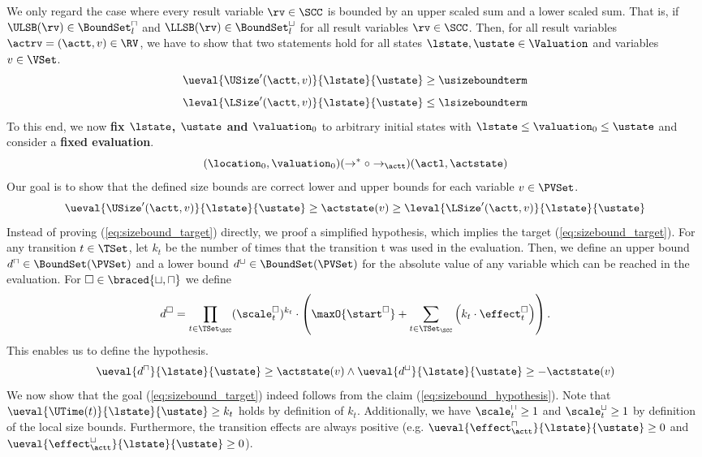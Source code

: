 We only regard the case where every result variable $\rv \in \SCC$ is bounded by an upper scaled sum and a lower scaled sum.
That is, if $\ULSB(\rv) \in \BoundSet^\sqcap_l$ and $\LLSB(\rv) \in \BoundSet^\sqcup_l$ for all result variables $\rv \in \SCC$.
Then, for all result variables $\actrv = (\actt, v) \in \RV$, we have to show that two statements hold for all states $\lstate, \ustate \in \Valuation$ and variables $v \in \VSet$.
\[ \ueval{\USize'(\actt, v)}{\lstate}{\ustate} \geq \usizeboundterm \]
\[ \leval{\LSize'(\actt, v)}{\lstate}{\ustate} \leq \lsizeboundterm \]
To this end, we now \textbf{fix $\lstate$, $\ustate$ and $\valuation_0$} to arbitrary initial states with $\lstate \leq \valuation_0 \leq \ustate$ and consider a \textbf{fixed evaluation}.
\[ (\location_0, \valuation_0) (\rightarrow^* \circ \rightarrow_\actt) (\actl, \actstate) \]
Our goal is to show that the defined size bounds are correct lower and upper bounds for each variable $v \in \PVSet$.
\begin{equation} \label{eq:sizebound_target}
  \ueval{\USize'(\actt, v)}{\lstate}{\ustate} \geq \actstate(v) \geq \leval{\LSize'(\actt, v)}{\lstate}{\ustate}
\end{equation}
Instead of proving (\ref{eq:sizebound_target}) directly, we proof a simplified hypothesis, which implies the target (\ref{eq:sizebound_target}).
For any transition $t \in \TSet$, let $k_t$ be the number of times that the transition t was used in the evaluation.
Then, we define an upper bound $d^\sqcap \in \BoundSet(\PVSet)$ and a lower bound $d^\sqcup \in \BoundSet(\PVSet)$ for the absolute value of any variable which can be reached in the evaluation.
For $\square \in \braced{\sqcup, \sqcap}$ we define
\[ d^\square = \prod_{t \in \TSet_\SCC} (\scale^\square_t)^{k_t} \cdot \left( \maxO{\start^\square} + \sum_{t \in \TSet_\SCC} \left( k_t \cdot \effect^\square_t \right) \right). \]
This enables us to define the hypothesis.
\begin{equation} \label{eq:sizebound_hypothesis}
  \ueval{d^\sqcap}{\lstate}{\ustate} \geq \actstate(v) \wedge \ueval{d^\sqcup}{\lstate}{\ustate} \geq -\actstate(v)
\end{equation}
We now show that the goal (\ref{eq:sizebound_target}) indeed follows from the claim (\ref{eq:sizebound_hypothesis}).
Note that $\ueval{\UTime(t)}{\lstate}{\ustate} \geq k_t$ holds by definition of $k_t$.
Additionally, we have $\scale^\sqcap_t \geq 1$ and $\scale^\sqcup_t \geq 1$ by definition of the local size bounds.
Furthermore, the transition effects are always positive (e.g. $\ueval{\effect^\sqcap_\actt}{\lstate}{\ustate} \geq 0$ and $\ueval{\effect^\sqcup_\actt}{\lstate}{\ustate} \geq 0$).
